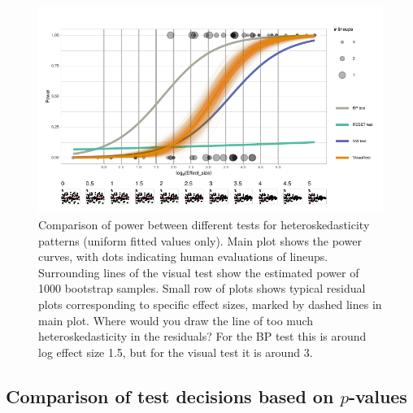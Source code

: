 \documentclass[]{interact}
\theoremstyle{plain}%
\theoremstyle{definition}
\theoremstyle{remark}
\begin{document}
\begin{figure}

{\centering \includegraphics[width=1\linewidth]{paper_comparison_files/figure-latex/heterpower-1} 

}

\caption{Comparison of power between different tests for heteroskedasticity patterns (uniform fitted values only). Main plot shows the power curves, with dots indicating human evaluations of lineups. Surrounding lines of the visual test show the estimated power of 1000 bootstrap samples. Small row of plots shows typical residual plots corresponding to specific effect sizes, marked by dashed lines in main plot. Where would you draw the line of too much heteroskedasticity in the residuals? For the BP test this is around log effect size 1.5, but for the visual test it is around 3.}\label{fig:heterpower}
\end{figure}

\hypertarget{comparison-of-test-decisions-based-on-p-values}{%
\subsection{\texorpdfstring{Comparison of test decisions based on
\(p\)-values}{Comparison of test decisions based on p-values}}\label{comparison-of-test-decisions-based-on-p-values}}
\end{document}
